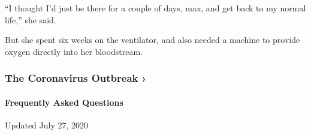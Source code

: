``I thought I'd just be there for a couple of days, max, and get back to
my normal life,'' she said.

But she spent six weeks on the ventilator, and also needed a machine to
provide oxygen directly into her bloodstream.

\href{https://www.nytimes.com/news-event/coronavirus?action=click\&pgtype=Article\&state=default\&region=MAIN_CONTENT_3\&context=storylines_faq}{}

\hypertarget{the-coronavirus-outbreak-}{%
\subsubsection{The Coronavirus Outbreak
›}\label{the-coronavirus-outbreak-}}

\hypertarget{frequently-asked-questions}{%
\paragraph{Frequently Asked
Questions}\label{frequently-asked-questions}}

Updated July 27, 2020


